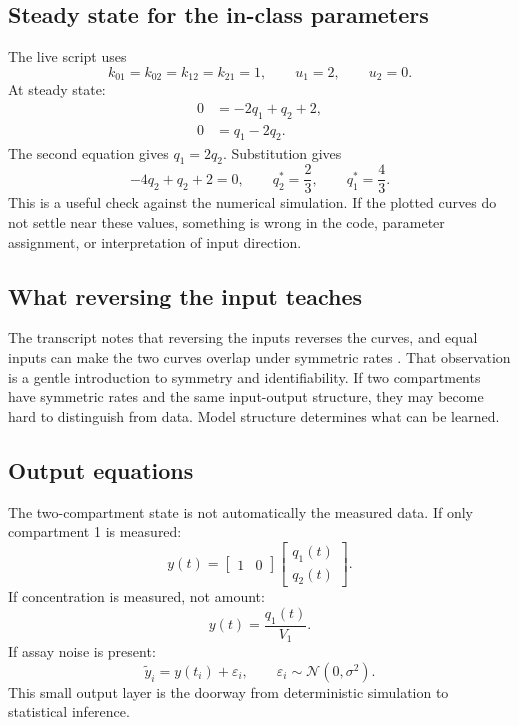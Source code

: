 \documentclass[a4paper]{article}
\newcommand{\Normal}{\mathcal{N}}
\newcommand{\qone}{q_1}
\newcommand{\qtwo}{q_2}
\begin{document}
\subsection{Steady state for the in-class parameters}

The live script uses
\[
  k_{01}=k_{02}=k_{12}=k_{21}=1,\qquad
  u_1=2,\qquad
  u_2=0.
\]
At steady state:
\[
  \begin{aligned}
  0&=-2\qone+\qtwo+2,\\
  0&=\qone-2\qtwo.
  \end{aligned}
\]
The second equation gives \(\qone=2\qtwo\). Substitution gives
\[
  -4\qtwo+\qtwo+2=0,
  \qquad
  \qtwo^*=\frac{2}{3},
  \qquad
  \qone^*=\frac{4}{3}.
\]
This is a useful check against the numerical simulation. If the plotted curves do not settle near these values, something is wrong in the code, parameter assignment, or interpretation of input direction.

\subsection{What reversing the input teaches}

The transcript notes that reversing the inputs reverses the curves, and equal inputs can make the two curves overlap under symmetric rates \cite{bmeg671TranscriptSep032025}. That observation is a gentle introduction to symmetry and identifiability. If two compartments have symmetric rates and the same input-output structure, they may become hard to distinguish from data. Model structure determines what can be learned.

\subsection{Output equations}

The two-compartment state is not automatically the measured data. If only compartment 1 is measured:
\[
  y(t)=
  \begin{bmatrix}1&0\end{bmatrix}
  \begin{bmatrix}\qone(t)\\ \qtwo(t)\end{bmatrix}.
\]
If concentration is measured, not amount:
\[
  y(t)=\frac{\qone(t)}{V_1}.
\]
If assay noise is present:
\[
  \tilde y_i = y(t_i)+\varepsilon_i,
  \qquad
  \varepsilon_i\sim\Normal(0,\sigma^2).
\]
This small output layer is the doorway from deterministic simulation to statistical inference.
\end{document}
